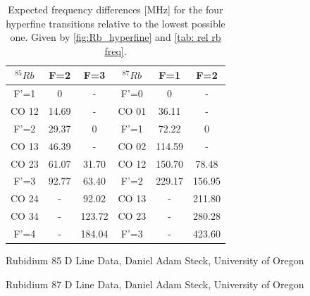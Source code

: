 \documentclass[]{article}
\begin{document}
\begin{table}[H]
\centering
\begin{tabular}{c|c|c| |c|c|c}
$^{85}Rb$ & F=2 & F=3 & $^{87}Rb$ & F=1 & F=2 \\ \hline\hline
F'=1 & 0    & -     & F'=0 & 0     & - \\
CO 12& 14.69& -     & CO 01& 36.11 & - \\
F'=2 & 29.37& 0     & F'=1 & 72.22 & 0 \\
CO 13& 46.39& -     & CO 02& 114.59& - \\
CO 23& 61.07& 31.70 & CO 12& 150.70& 78.48 \\
F'=3 & 92.77& 63.40 & F'=2 & 229.17& 156.95 \\
CO 24& -    & 92.02 & CO 13& -     & 211.80 \\
CO 34& -    & 123.72& CO 23& -     & 280.28 \\
F'=4 & -    & 184.04& F'=3 & -     & 423.60 \\
\end{tabular}
\caption{Expected frequency differences [MHz] for the four hyperfine transitions relative to the lowest possible one. Given by \autoref{fig:Rb_hyperfine} and \autoref{tab: rel rb freq}.}
\label{tab: rel rb freq}
\end{table}


\newpage
\begin{thebibliography}{}
 Rubidium 85 D Line Data, Daniel Adam Steck, University of Oregon

 Rubidium 87 D Line Data, Daniel Adam Steck, University of Oregon


\end{thebibliography}
\end{document}

